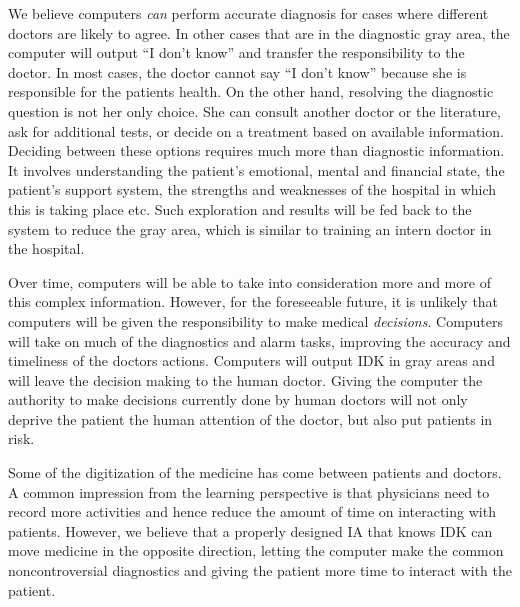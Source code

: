 \documentclass[11pt]{pnas-new}
\begin{document}
  We believe computers {\em can} perform accurate diagnosis for cases where
  different doctors are likely to agree. In other cases {\color{blue}that are in the}
  diagnostic gray area, the computer will output ``I don't know'' and
  transfer the responsibility to the doctor. In most cases, the doctor
  cannot say ``I don't know'' because she is responsible for the
  patients health. On the other hand, resolving the diagnostic
  question is not her only choice. She can consult another doctor or
  the literature, ask for additional tests, or decide on a treatment
  based on available information. Deciding between these options requires much
  more than diagnostic information. It involves understanding the
  patient's emotional, mental and financial state, the patient's
  support system, the strengths and weaknesses of the hospital in
  which this is taking place etc. {\color{blue}Such exploration and results will be fed back to the system to reduce the gray area, which is similar to training an intern doctor in the hospital.}

  Over time, computers will be able to take into consideration more
  and more of this complex information. However, for the foreseeable
  future, it is unlikely that computers will be given the
  responsibility to make medical {\em decisions}. Computers
  will take on much of the diagnostics and alarm tasks, improving the
  accuracy and timeliness of the doctors actions. Computers will
  output IDK in gray areas and will leave the decision making to the
  human doctor. Giving the computer the authority to make decisions
  currently done by human doctors will {\color{blue}not only} deprive the patient the human
  attention of the doctor{\color{blue}, but also put patients in risk}.

  Some of the digitization of the medicine has come between patients
  and doctors. {\color{blue}A common impression from the learning perspective is that physicians need to record more activities and hence reduce the amount of time on interacting with patients. However, we} %
  believe that {\color{blue}a properly designed } IA {\color{blue}that knows IDK} can
  move medicine in the opposite direction, letting the computer make
  the common noncontroversial diagnostics and giving the patient more
  time to interact with the patient.
\end{document}
